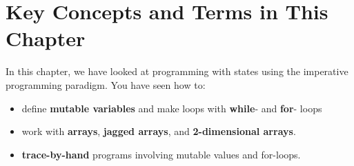 \documentclass[fsharpNotes.tex]{subfiles}
\begin{document}
\section{Key Concepts and Terms in This Chapter}
In this chapter, we have looked at programming with states using the imperative programming paradigm. You have seen how to:
\begin{itemize}
\item define \textbf{mutable variables} and make loops with \textbf{while}- and \textbf{for}- loops
\item work with \textbf{arrays}, \textbf{jagged arrays}, and \textbf{2-dimensional arrays}.
\item \textbf{trace-by-hand} programs involving mutable values and for-loops.
\end{itemize}
\end{document}
